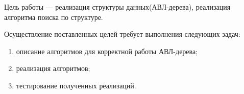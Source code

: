 \par Цель работы --- реализация структуры данных(АВЛ-дерева), реализация алгоритма поиска по структуре. \par 
Осуществление поставленных целей требует выполнения следующих задач: 
\begin{enumerate}
	\item описание алгоритмов для корректной работы АВЛ-дерева; 
	\item реализация алгоритмов;
	\item тестирование полученных реализаций.
\end{enumerate} 


\clearpage
